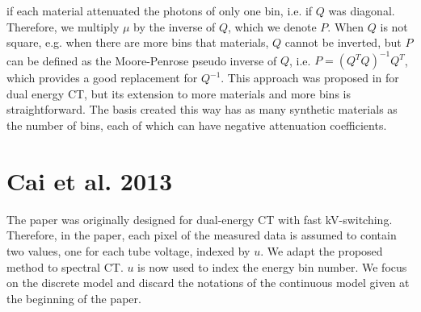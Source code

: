 \documentclass[a4paper, 10pt]{article}
\begin{document}
\begin{itemize}
if each material attenuated the photons of only one bin, i.e. if $Q$ was diagonal. Therefore, we multiply $\mu$ by the inverse of $Q$, which we denote $P$.
When $Q$ is not square, e.g. when there are more bins that materials, $Q$ cannot be inverted, but $P$ can be defined as the Moore-Penrose pseudo inverse of $Q$, i.e.
$P = (Q^TQ)^{-1}Q^T$, which provides a good replacement for $Q^{-1}$. This approach was proposed in \cite{fessler_method_2003} for dual energy CT,
but its extension to more materials and more bins is straightforward.
The basis created this way has as many synthetic materials as the number of bins, each of which can have negative attenuation coefficients.
\end{itemize}

\section{Cai et al. 2013}
The paper \cite{cai_full-spectral_2013} was originally designed for dual-energy CT with fast kV-switching. Therefore, in the paper, each 
pixel of the measured data is assumed to contain two values, one for each tube voltage, indexed by $u$. We adapt the proposed method to spectral CT.
$u$ is now used to index the energy bin number. We focus on the discrete model and discard the notations of the continuous model given
at the beginning of the paper. 
\end{document}
